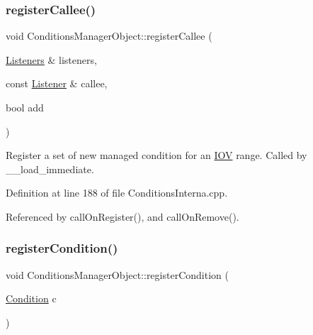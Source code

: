 \subsubsection{\texorpdfstring{register\+Callee()}{registerCallee()}}
{\footnotesize\ttfamily void Conditions\+Manager\+Object\+::register\+Callee (\begin{DoxyParamCaption}\item[{\hyperlink{class_d_d4hep_1_1_conditions_1_1_conditions_manager_object_aba0162524bc90a39e30bd5f1f0067ee2}{Listeners} \&}]{listeners,  }\item[{const \hyperlink{class_d_d4hep_1_1_conditions_1_1_conditions_manager_object_ac4cd1e3a448bc1f8bae384d194f10c23}{Listener} \&}]{callee,  }\item[{bool}]{add }\end{DoxyParamCaption})\hspace{0.3cm}{\ttfamily [protected]}}



Register a set of new managed condition for an \hyperlink{class_d_d4hep_1_1_i_o_v}{I\+OV} range. Called by \+\_\+\+\_\+load\+\_\+immediate. 



Definition at line 188 of file Conditions\+Interna.\+cpp.



Referenced by call\+On\+Register(), and call\+On\+Remove().

\hypertarget{class_d_d4hep_1_1_conditions_1_1_conditions_manager_object_af839b57cfdda205e2555e757651423fd}{}\label{class_d_d4hep_1_1_conditions_1_1_conditions_manager_object_af839b57cfdda205e2555e757651423fd} 
\subsubsection{\texorpdfstring{register\+Condition()}{registerCondition()}}
{\footnotesize\ttfamily void Conditions\+Manager\+Object\+::register\+Condition (\begin{DoxyParamCaption}\item[{\hyperlink{class_d_d4hep_1_1_conditions_1_1_condition}{Condition}}]{c }\end{DoxyParamCaption})}



